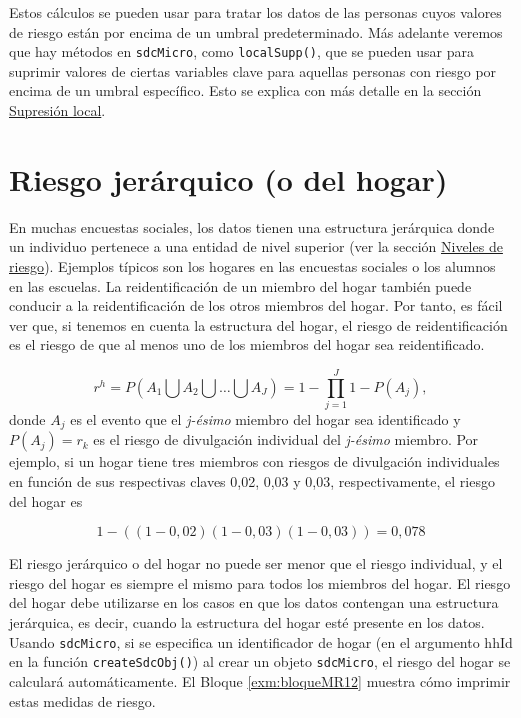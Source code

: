 \documentclass[]{book}
\newenvironment{Shaded}{\begin{snugshade}}{\end{snugshade}}
\newcommand{\DecValTok}[1]{\textcolor[rgb]{0.00,0.00,0.81}{#1}}
\newcommand{\FloatTok}[1]{\textcolor[rgb]{0.00,0.00,0.81}{#1}}
\newcommand{\KeywordTok}[1]{\textcolor[rgb]{0.13,0.29,0.53}{\textbf{#1}}}
\newcommand{\NormalTok}[1]{#1}
\newcommand{\OperatorTok}[1]{\textcolor[rgb]{0.81,0.36,0.00}{\textbf{#1}}}
\newcommand{\StringTok}[1]{\textcolor[rgb]{0.31,0.60,0.02}{#1}}
\theoremstyle{definition}
\theoremstyle{definition}
\theoremstyle{definition}
\theoremstyle{definition}
\theoremstyle{remark}
\begin{document}
\begin{Shaded}
\end{Shaded}

Estos cálculos se pueden usar para tratar los datos de las personas cuyos valores de riesgo están por encima de un umbral predeterminado. Más adelante veremos que hay métodos en \texttt{sdcMicro}, como \texttt{localSupp()}, que se pueden usar para suprimir valores de ciertas variables clave para aquellas personas con riesgo por encima de un umbral específico. Esto se explica con más detalle en la sección \protect\hyperlink{sup-loc}{Supresión local}.

\hypertarget{riesgo-jeruxe1rquico-o-del-hogar}{%
\section{Riesgo jerárquico (o del hogar)}\label{riesgo-jeruxe1rquico-o-del-hogar}}

En muchas encuestas sociales, los datos tienen una estructura jerárquica donde un individuo pertenece a una entidad de nivel superior (ver la sección \protect\hyperlink{niveles-de-riesgo}{Niveles de riesgo}). Ejemplos típicos son los hogares en las encuestas sociales o los alumnos en las escuelas. La reidentificación de un miembro del hogar también puede conducir a la reidentificación de los otros miembros del hogar. Por tanto, es fácil ver que, si tenemos en cuenta la estructura del hogar, el riesgo de reidentificación es el riesgo de que al menos uno de los miembros del hogar sea reidentificado.

\[r^h=P(A_{1}\bigcup A_{2}\bigcup \dots \bigcup A_{J})=1-\prod_{j=1}^J 1-P(A_{j}), \]
donde \(A_{j}\) es el evento que el \emph{j-ésimo} miembro del hogar sea identificado y \(P(A_{j})=r_{k}\) es el riesgo de divulgación individual del \emph{j-ésimo} miembro. Por ejemplo, si un hogar tiene tres miembros con riesgos de divulgación individuales en función de sus respectivas claves 0,02, 0,03 y 0,03, respectivamente, el riesgo del hogar es

\[1-((1-0,02)(1-0,03)(1-0,03))=0,078\]

El riesgo jerárquico o del hogar no puede ser menor que el riesgo individual, y el riesgo del hogar es siempre el mismo para todos los miembros del hogar. El riesgo del hogar debe utilizarse en los casos en que los datos contengan una estructura jerárquica, es decir, cuando la estructura del hogar esté presente en los datos. Usando \texttt{sdcMicro}, si se especifica un identificador de hogar (en el argumento hhId en la función \texttt{createSdcObj()}) al crear un objeto \texttt{sdcMicro}, el riesgo del hogar se calculará automáticamente. El Bloque \ref{exm:bloqueMR12} muestra cómo imprimir estas medidas de riesgo.
\end{document}
